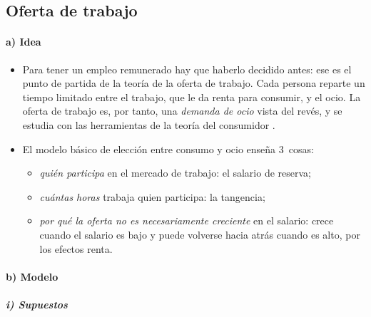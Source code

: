 \documentclass[11pt]{article}
\begin{document}
\subsection{Oferta de trabajo}\label{sec:oferta}

\paragraph{a) Idea}\label{sec:oferta-idea}

\begin{itemize}
\item Para tener un empleo remunerado hay que haberlo decidido antes: ese es el punto de partida de la teoría de la oferta de trabajo. Cada persona reparte un tiempo limitado entre el trabajo, que le da renta para consumir, y el ocio. La oferta de trabajo es, por tanto, una \emph{demanda de ocio} vista del revés, y se estudia con las herramientas de la teoría del consumidor .
\item El modelo básico de elección entre consumo y ocio enseña 3~cosas:
  \begin{itemize}
  \item \emph{quién participa} en el mercado de trabajo: el salario de reserva;
  \item \emph{cuántas horas} trabaja quien participa: la tangencia;
  \item \emph{por qué la oferta no es necesariamente creciente} en el salario: crece cuando el salario es bajo y puede volverse hacia atrás cuando es alto, por los efectos renta.
  \end{itemize}
\end{itemize}

\paragraph{b) Modelo}\label{sec:oferta-modelo}

\subparagraph{i) Supuestos}
\end{document}
